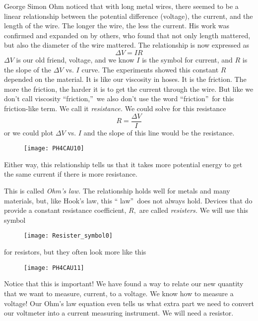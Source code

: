 George Simon Ohm noticed that with long metal wires, there seemed to be a
linear relationship between the potential difference (voltage), the current,
and the length of the wire. The longer the wire, the less the current. His
work was confirmed and expanded on by others, who found that not only length
mattered, but also the diameter of the wire mattered. The relationship is
now expressed as%
\begin{equation*}
\Delta V=IR
\end{equation*}%
$\Delta V$ is our old friend, voltage, and we know $I$ is the symbol for
current, and $R$ is the slope of the $\Delta V$ vs. $I$ curve. The
experiments showed this constant $R$ depended on the material. It is like
our viscosity in hoses. It is the friction. The more the friction, the
harder it is to get the current through the wire. But like we don't call
viscosity \textquotedblleft friction,\textquotedblright\ we also don't use
the word \textquotedblleft friction\textquotedblright\ for this
friction-like term. We call it \emph{resistance.} We could solve for this
resistance 
\begin{equation*}
R=\frac{\Delta V}{I}
\end{equation*}%
or we could plot $\Delta V$ vs. $I$ and the slope of this line would be the
resistance.\begin{figure}[h!]
\texttt{[image: PH4CAU10]}
\end{figure}Either way, this relationship
tells us that it takes more potential energy to get the same current if
there is more resistance.

This is called \emph{Ohm's law.} The relationship holds well for metals and
many materials, but, like Hook's law, this \textquotedblleft
law\textquotedblright\ does not always hold. Devices that do provide a
constant resistance coefficient, $R,$ are called \emph{resisters. }We will
use this symbol

\begin{figure}[h!]
	\centering
    \texttt{[image: Resister\_symbol0]}
\end{figure}

for resistors, but they
often look more like this

\begin{figure}[h!]
	\centering
    \texttt{[image: PH4CAU11]}
\end{figure}

Notice that this is important! We have found a way to relate our new
quantity that we want to measure, current, to a voltage. We know how to
measure a voltage! Our Ohm's law equation even tells us what extra part we
need to convert our voltmeter into a current measuring instrument. We will
need a resistor.

